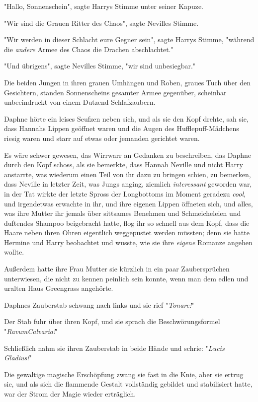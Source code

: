 {"Hallo, Sonnenschein", sagte Harrys Stimme unter seiner Kapuze.

"Wir sind die Grauen Ritter des Chaos", sagte Nevilles Stimme.

"Wir werden in dieser Schlacht eure Gegner sein", sagte Harrys Stimme, "während die \emph{andere} Armee des Chaos die Drachen abschlachtet."

"Und übrigens", sagte Nevilles Stimme, "wir sind unbesiegbar."

Die beiden Jungen in ihren grauen Umhängen und Roben, graues Tuch über den Gesichtern, standen Sonnenscheins gesamter Armee gegenüber, scheinbar unbeeindruckt von einem Dutzend Schlafzaubern.

Daphne hörte ein leises Seufzen neben sich, und als sie den Kopf drehte, sah sie, dass Hannahs Lippen geöffnet waren und die Augen des Hufflepuff-Mädchens riesig waren und starr auf etwas oder jemanden gerichtet waren.

Es wäre schwer gewesen, das Wirrwarr an Gedanken zu beschreiben, das Daphne durch den Kopf schoss, als sie bemerkte, dass Hannah Neville und nicht Harry anstarrte, was wiederum einen Teil von ihr dazu zu bringen schien, zu bemerken, dass Neville in letzter Zeit, was Jungs anging, ziemlich \emph{interessant} geworden war, in der Tat wirkte der letzte Spross der Longbottoms im Moment geradezu \emph{cool}, und irgendetwas erwachte in ihr, und ihre eigenen Lippen öffneten sich, und alles, was ihre Mutter ihr jemals über sittsames Benehmen und Schmeicheleien und duftendes Shampoo beigebracht hatte, flog ihr so schnell aus dem Kopf, dass die Haare neben ihren Ohren eigentlich weggepustet werden müssten; denn sie hatte Hermine und Harry beobachtet und wusste, wie sie ihre \emph{eigene} Romanze angehen wollte.

Außerdem hatte ihre Frau Mutter sie kürzlich in ein paar Zaubersprüchen unterwiesen, die nicht zu kennen peinlich sein konnte, wenn man dem edlen und uralten Haus Greengrass angehörte.

Daphnes Zauberstab schwang nach links und sie rief "\emph{Tonare!}"

Der Stab fuhr über ihren Kopf, und sie sprach die Beschwörungsformel "\emph{RavumCalvaria!}"

Schließlich nahm sie ihren Zauberstab in beide Hände und schrie: "\emph{Lucis} \emph{Gladius!}"

Die gewaltige magische Erschöpfung zwang sie fast in die Knie, aber sie ertrug sie, und als sich die flammende Gestalt vollständig gebildet und stabilisiert hatte, war der Strom der Magie wieder erträglich.

}
